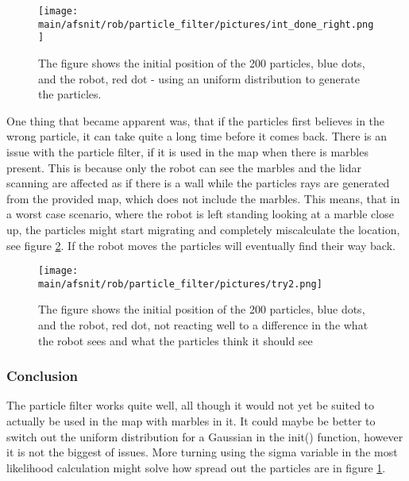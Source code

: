 \documentclass[../../../Main.tex]{subfiles}
\begin{document}
\begin{figure}[H]
  \centering
  \texttt{[image: \\main/afsnit/rob/particle\_filter/pictures/int\_done\_right.png]}
  \caption{The figure shows the initial position of the 200 particles, blue dots, and the robot, red dot - using an uniform distribution to generate the particles.}
  \label{fig:particle_filter_1}
\end{figure}

One thing that became apparent was, that if the particles first believes in the wrong particle, it can take quite a long time before it comes back.
There is an issue with the particle filter, if it is used in the map when there is marbles present. This is because only the robot can see the marbles and the lidar scanning are affected as if there is a wall while the particles rays are generated from the provided map, which does not include the marbles. This means, that in a worst case scenario, where the robot is left standing looking at a marble close up, the particles might start migrating and completely miscalculate the location, see figure \ref{fig:u_fucked}. If the robot moves the particles will eventually find their way back.

\begin{figure}[H]
  \centering
  \texttt{[image: \\main/afsnit/rob/particle\_filter/pictures/try2.png]}
  \caption{The figure shows the initial position of the 200 particles, blue dots, and the robot, red dot, not reacting well to a difference in the what the robot sees and what the particles think it should see }
  \label{fig:u_fucked}
\end{figure}
\subsubsection{Conclusion}
The particle filter works quite well, all though it would not yet be suited to actually be used in the map with marbles in it. It could maybe be better to switch out the uniform distribution for a Gaussian in the init() function, however it is not the biggest of issues. More turning using the sigma variable in the most likelihood calculation might solve how spread out the particles are in figure \ref{fig:particle_filter_1}.
\end{document}
